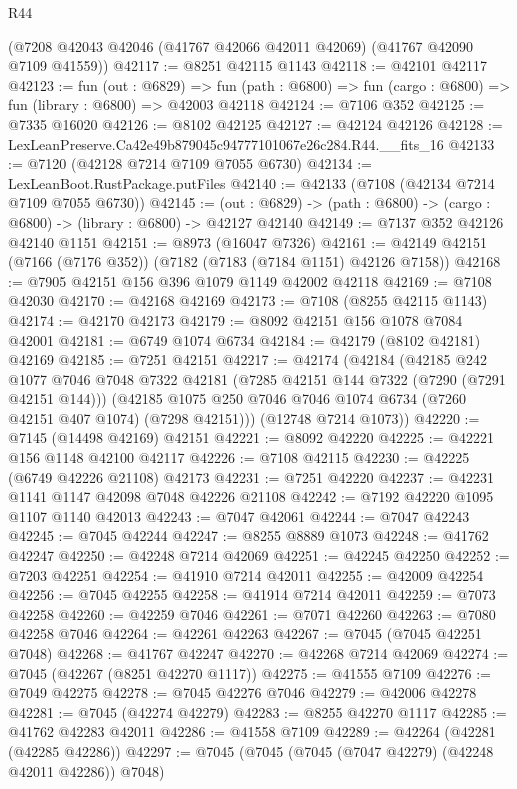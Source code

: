 \begin{lexlean}{R44}
\begin{coremodule}
{    (@7208 @42043 @42046 (@41767 @42066 @42011 @42069) (@41767 @42090 @7109 @41559))
@42117 := @8251 @42115 @1143
@42118 := @42101 @42117
@42123 := fun (out : @6829) =>
  fun (path : @6800) => fun (cargo : @6800) => fun (library : @6800) => @42003 @42118
@42124 := @7106 @352
@42125 := @7335 @16020
@42126 := @8102 @42125
@42127 := @42124 @42126
@42128 := LexLeanPreserve.Ca42e49b879045c94777101067e26c284.R44.__fits_16
@42133 := @7120 (@42128 @7214 @7109 @7055 @6730)
@42134 := LexLeanBoot.RustPackage.putFiles
@42140 := @42133 (@7108 (@42134 @7214 @7109 @7055 @6730))
@42145 := (out : @6829) -> (path : @6800) -> (cargo : @6800) -> (library : @6800) -> @42127 @42140
@42149 := @7137 @352 @42126 @42140 @1151
@42151 := @8973 (@16047 @7326)
@42161 := @42149 @42151 (@7166 (@7176 @352)) (@7182 (@7183 (@7184 @1151) @42126 @7158))
@42168 := @7905 @42151 @156 @396 @1079 @1149 @42002 @42118
@42169 := @7108 @42030
@42170 := @42168 @42169
@42173 := @7108 (@8255 @42115 @1143)
@42174 := @42170 @42173
@42179 := @8092 @42151 @156 @1078 @7084 @42001
@42181 := @6749 @1074 @6734
@42184 := @42179 (@8102 @42181) @42169
@42185 := @7251 @42151
@42217 := @42174
    (@42184
      (@42185
        @242
        @1077
        @7046
        @7048
        @7322
        @42181
        (@7285 @42151 @144 @7322 (@7290 (@7291 @42151 @144)))
        (@42185 @1075 @250 @7046 @7046 @1074 @6734 (@7260 @42151 @407 @1074) (@7298 @42151)))
      (@12748 @7214 @1073))
@42220 := @7145 (@14498 @42169) @42151
@42221 := @8092 @42220
@42225 := @42221 @156 @1148 @42100 @42117
@42226 := @7108 @42115
@42230 := @42225 (@6749 @42226 @21108) @42173
@42231 := @7251 @42220
@42237 := @42231 @1141 @1147 @42098 @7048 @42226 @21108
@42242 := @7192 @42220 @1095 @1107 @1140 @42013
@42243 := @7047 @42061
@42244 := @7047 @42243
@42245 := @7045 @42244
@42247 := @8255 @8889 @1073
@42248 := @41762 @42247
@42250 := @42248 @7214 @42069
@42251 := @42245 @42250
@42252 := @7203 @42251
@42254 := @41910 @7214 @42011
@42255 := @42009 @42254
@42256 := @7045 @42255
@42258 := @41914 @7214 @42011
@42259 := @7073 @42258
@42260 := @42259 @7046
@42261 := @7071 @42260
@42263 := @7080 @42258 @7046
@42264 := @42261 @42263
@42267 := @7045 (@7045 @42251 @7048)
@42268 := @41767 @42247
@42270 := @42268 @7214 @42069
@42274 := @7045 (@42267 (@8251 @42270 @1117))
@42275 := @41555 @7109
@42276 := @7049 @42275
@42278 := @7045 @42276 @7046
@42279 := @42006 @42278
@42281 := @7045 (@42274 @42279)
@42283 := @8255 @42270 @1117
@42285 := @41762 @42283 @42011
@42286 := @41558 @7109
@42289 := @42264 (@42281 (@42285 @42286))
@42297 := @7045 (@7045 (@7045 (@7047 @42279) (@42248 @42011 @42286)) @7048)
}
\end{coremodule}
\end{lexlean}
